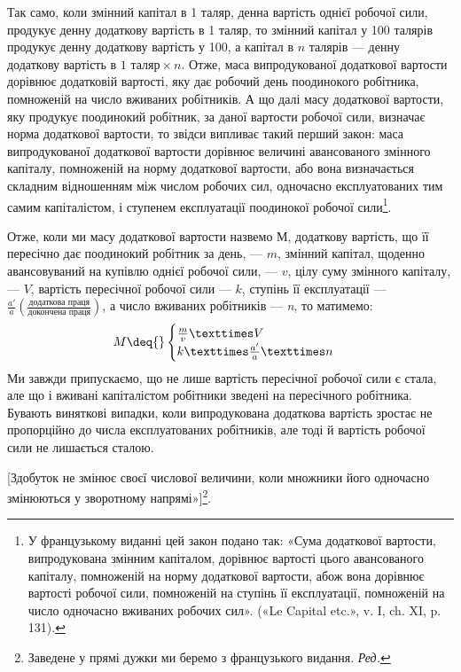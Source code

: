 Так само, коли змінний капітал в 1 таляр, денна вартість однієї
робочої сили, продукує денну додаткову вартість в 1 таляр, то
змінний капітал у 100 талярів продукує денну додаткову вартість
у 100, а капітал в $n$ талярів — денну додаткову вартість в $1\text{ таляр} × n$.
Отже, маса випродукованої додаткової вартости дорівнює додатковій
вартості, яку дає робочий день поодинокого робітника,
помноженій на число вживаних робітників. А що далі масу додаткової
вартости, яку продукує поодинокий робітник, за даної вартости
робочої сили, визначає норма додаткової вартости, то звідси
випливає такий перший закон: маса випродукованої додаткової
вартости дорівнює величині авансованого змінного капіталу, помноженій
на норму додаткової вартости, або вона визначається
складним відношенням між числом робочих сил, одночасно експлуатованих
тим самим капіталістом, і ступенем експлуатації
поодинокої робочої сили\footnote*{
У французькому виданні цей закон подано так: «Сума додаткової
вартости, випродукована змінним капіталом, дорівнює вартості цього
авансованого капіталу, помноженій на норму додаткової вартости, абож
вона дорівнює вартості робочої сили, помноженій на ступінь її експлуатації,
помноженій на число одночасно вживаних робочих сил». («Le Capital
etc.», v. I, ch. XI, p. 131). \Red
}.

Отже, коли ми масу додаткової вартости назвемо $М$, додаткову
вартість, що її пересічно дає поодинокий робітник за день, — $m$,
змінний капітал, щоденно авансовуваний на купівлю однієї робочої
сили, — $v$, цілу суму змінного капіталу, — $V$, вартість пересічної
робочої сили — $k$, ступінь її експлуатації —
$\frac{a'}{a}\left(\frac{\text{додаткова праця}}{\text{докончена праця}}\right)$,
а число вживаних робітників — \emph{n}, то матимемо: \[
M \deq{}
\begin{cases}
\frac{m}{v} × V & \\
k × \frac{a'}{a} × n & \\
\end{cases}
\]
\noindent{}Ми завжди припускаємо, що не лише вартість пересічної робочої
сили є стала, але що і вживані капіталістом робітники зведені
на пересічного робітника. Бувають виняткові випадки, коли
випродукована додаткова вартість зростає не пропорційно до числа
експлуатованих робітників, але тоді й вартість робочої сили не
лишається сталою.

[Здобуток не змінює своєї числової величини, коли множники
його одночасно змінюються у зворотному напрямі»]\footnote*{
Заведене у прямі дужки ми беремо з французького видання. \emph{Ред.}
}.

